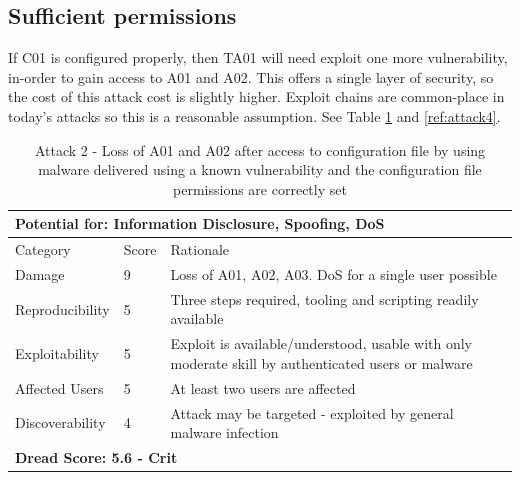 \documentclass [11pt, proquest] {uwthesis}[2020/02/24]
\begin{document}
\subsection{Sufficient permissions}
If C01 is configured properly, then TA01 will need exploit one more vulnerability, in-order to gain access to A01 and A02. This offers a single layer of security, so the cost of this attack cost is slightly higher. Exploit chains are common-place in today's attacks so this is a reasonable assumption.  
See Table \ref{ref:attack2} and \ref{ref:attack4}.
\begin{table}[H]

\begin{tabular}{|m{3cm}|m{1cm}|p{27em} |}
\multicolumn{3}{l}{Potential for: Information Disclosure, Spoofing, DoS}                   \\
\hline
Category & Score & Rationale \\
\hline
Damage          & 9     & Loss of A01, A02, A03. DoS for a single user possible            \\
\hline
Reproducibility & 5     & Three steps required, tooling and scripting readily available    \\
\hline
Exploitability & 5      & Exploit is available/understood, usable with only moderate skill by authenticated users or malware \\
\hline
Affected Users  & 5     & At least two users are affected                      \\
\hline
Discoverability & 4     & Attack may be targeted - exploited by general malware infection \\
\hline
\multicolumn{3}{l}{\textbf{Dread Score: 5.6 - Crit}} 
\end{tabular}
\caption{Attack 2 - Loss of A01 and A02 after access to configuration file by using malware delivered using a known vulnerability and the configuration file permissions are correctly set}
\label{ref:attack2}
\end{table}
\end{document}
